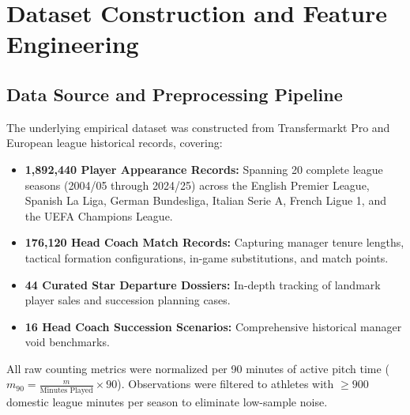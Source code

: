 \documentclass[10pt,journal,compsoc]{IEEEtran}
\begin{document}
\section{Dataset Construction and Feature Engineering}
\label{sec:data}

\subsection{Data Source and Preprocessing Pipeline}
The underlying empirical dataset was constructed from Transfermarkt Pro and European league historical records, covering:
\begin{itemize}
    \item \textbf{1,892,440 Player Appearance Records:} Spanning 20 complete league seasons (2004/05 through 2024/25) across the English Premier League, Spanish La Liga, German Bundesliga, Italian Serie A, French Ligue 1, and the UEFA Champions League.
    \item \textbf{176,120 Head Coach Match Records:} Capturing manager tenure lengths, tactical formation configurations, in-game substitutions, and match points.
    \item \textbf{44 Curated Star Departure Dossiers:} In-depth tracking of landmark player sales and succession planning cases.
    \item \textbf{16 Head Coach Succession Scenarios:} Comprehensive historical manager void benchmarks.
\end{itemize}

All raw counting metrics were normalized per 90 minutes of active pitch time ($m_{90} = \frac{m}{\text{Minutes Played}} \times 90$). Observations were filtered to athletes with $\ge 900$ domestic league minutes per season to eliminate low-sample noise.
\end{document}
